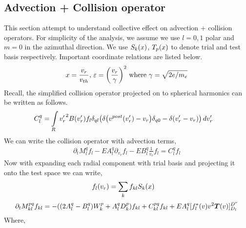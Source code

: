\documentclass{article}[draft]
\begin{document}
\subsection{Advection + Collision operator}
This section attempt to understand collective effect on advection + collision operators. For simplicity of the analysis, we assume we use $l=0,1$ polar and $m=0$ in the azimuthal direction. We use $S_k\of{x}$, $T_p\of{x}$ to denote trial and test basis respectively. Important coordinate relations are listed below. 
\begin{align*}
x =\frac{v_r}{v_{th}} \text{, } \varepsilon = \of{\frac{v_r}{\gamma}}^2 \text{ where } \gamma = \sqrt{2 e / m_e}
\end{align*}
Recall, the simplified collision operator projected on to spherical harmonics can be written as follows. 
\begin{align*}
C^{q}_{l} &= \myint_{R} {v^\prime_r}^2 B(v^\prime_r) f_l \delta_{ql}\of{\delta\of{v^{post}(v^\prime_r)-v_r} \delta_{q0} - \delta\of{v^\prime_r -v_r}} \diff{v^\prime_r}
\end{align*} We can write the collision operator with advection terms, 
\begin{align*}
\partial_t M^{q}_{l} f_{l}
-E A^{q}_{l} \partial_{v_r} f_{l}  
-E B^{q}_{l} \frac{1}{v_r}f_{l}  = 
C^{q}_{l}f_{l}
\end{align*} Now with expanding each radial component with trial basis and projecting it onto the test space we can write, 
\begin{align*}
f_l\of{v_r} &= \sum_{k} f_{kl} S_k(x) 
\end{align*}
\begin{align*}
\partial_t M^{pq}_{kl} f_{kl} = -\of{\of{2 A^{q}_{l} -B^{q}_{l}} W^p_{k} + A^{q}_{l} D^{p}_{k}}f_{kl} + C^{pq}_{kl} f_{kl} + EA^{q}_{l}[f_{l}^*(v) v^2 \boldsymbol{T}\of{v}]_{D_l}^{D^r}
\end{align*}Where, 
\end{document}
